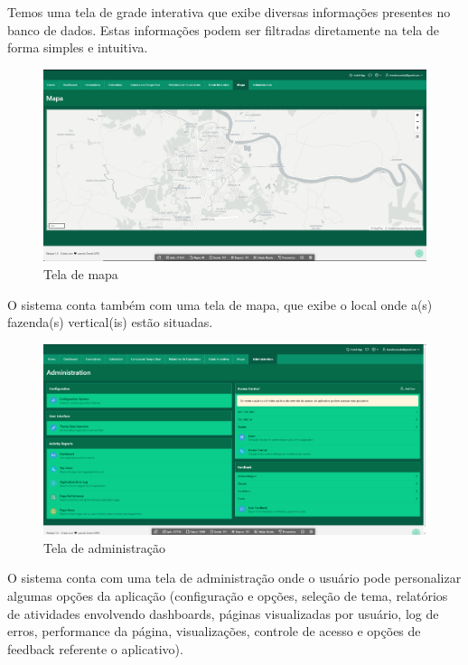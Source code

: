 Temos uma tela de grade interativa que exibe diversas informações presentes no banco de dados. Estas informações podem ser filtradas diretamente na tela de forma simples e intuitiva.
\clearpage
\begin{figure}[!h]
\centering
\caption{Tela de mapa}
\label{fig:picture23}
\includegraphics[scale=0.2]{Illustrations/Tela_mapa.png}
\end{figure}
        
O sistema conta também com uma tela de mapa, que exibe o local onde a(s) fazenda(s) vertical(is) estão situadas.

\begin{figure}[!h]
\centering
\caption{Tela de administração}
\label{fig:picture24}
\includegraphics[scale=0.2]{Illustrations/Tela_adiministracao.png}
\end{figure}
            
O sistema conta com uma tela de administração onde o usuário pode personalizar algumas opções da aplicação (configuração e opções, seleção de tema, relatórios de atividades envolvendo dashboards, páginas visualizadas por usuário, log de erros, performance da página, visualizações, controle de acesso e opções de feedback referente o aplicativo).

